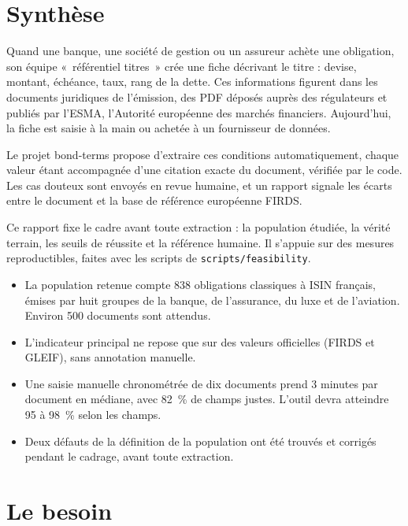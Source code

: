 \documentclass[11pt,a4paper]{article}
\begin{document}

\setcounter{tocdepth}{1}
\tableofcontents
\newpage

\section*{Synthèse}

Quand une banque, une société de gestion ou un assureur achète une obligation, son équipe «~référentiel titres~» crée une fiche décrivant le titre : devise, montant, échéance, taux, rang de la dette. Ces informations figurent dans les documents juridiques de l'émission, des PDF déposés auprès des régulateurs et publiés par l'ESMA, l'Autorité européenne des marchés financiers. Aujourd'hui, la fiche est saisie à la main ou achetée à un fournisseur de données.

Le projet bond-terms propose d'extraire ces conditions automatiquement, chaque valeur étant accompagnée d'une citation exacte du document, vérifiée par le code. Les cas douteux sont envoyés en revue humaine, et un rapport signale les écarts entre le document et la base de référence européenne FIRDS.

Ce rapport fixe le cadre avant toute extraction : la population étudiée, la vérité terrain, les seuils de réussite et la référence humaine. Il s'appuie sur des mesures reproductibles, faites avec les scripts de \texttt{scripts/feasibility}.

\begin{itemize}
  \item La population retenue compte 838 obligations classiques à ISIN français, émises par huit groupes de la banque, de l'assurance, du luxe et de l'aviation. Environ 500 documents sont attendus.
  \item L'indicateur principal ne repose que sur des valeurs officielles (FIRDS et GLEIF), sans annotation manuelle.
  \item Une saisie manuelle chronométrée de dix documents prend 3 minutes par document en médiane, avec 82~\% de champs justes. L'outil devra atteindre 95 à 98~\% selon les champs.
  \item Deux défauts de la définition de la population ont été trouvés et corrigés pendant le cadrage, avant toute extraction.
\end{itemize}

\section{Le besoin}
\end{document}
